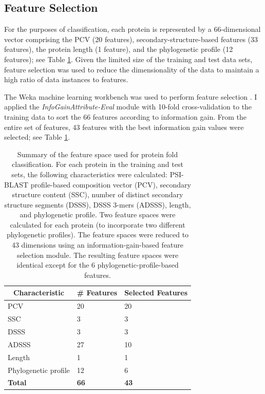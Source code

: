 \documentclass{bioinfo}
\begin{document}
\subsection*{Feature Selection}
For the purposes of classification, each protein is represented by a 66-dimensional vector comprising the PCV (20 features), secondary-structure-based features (33 features), the protein length (1 feature), and the phylogenetic profile (12 features); see Table \ref{FeatureSpaceTable}.
Given the limited size of the training and test data sets, feature selection was used to reduce the dimensionality of the data to maintain a high ratio of data instances to features.

The Weka machine learning workbench was used to perform feature selection \citep{Eibe}. I applied the \textit{InfoGainAttribute-Eval} module with 10-fold cross-validation to the training data to sort the 66 features according to information gain.
From the entire set of features, 43 features with the best information gain values were selected; see Table \ref{FeatureSpaceTable}.

\begin{table} \centering
  \begin{tabular}{ l l l }
    \hline
    \multicolumn{1}{c}{\textbf{Characteristic}} & \textbf{\# Features} & \multicolumn{1}{c}{\textbf{Selected Features}} \\ \hline
    PCV    & 20 & 20 \\
    SSC    & 3  & 3 \\
    DSSS   & 3  & 3 \\
    ADSSS  & 27 & 10 \\
    Length & 1 & 1 \\
    Phylogenetic profile & 12 & 6 \\
    \textbf{Total} & \textbf{66} & \textbf{43} \\ \hline
  \end{tabular}
  \vspace{5px}
  \caption{Summary of the feature space used for protein fold classification. For each protein in the training and test sets, the following characteristics were calculated: PSI-BLAST profile-based composition vector (PCV), secondary structure content (SSC), number of distinct secondary structure segments (DSSS), DSSS 3-mers (ADSSS), length, and phylogenetic profile. Two feature spaces were calculated for each protein (to incorporate two different phylogenetic profiles). The feature spaces were reduced to 43 dimensions using an information-gain-based feature selection module. The resulting feature spaces were identical except for the 6 phylogenetic-profile-based features.}
  \label{FeatureSpaceTable}
\end{table}
\end{document}
